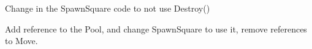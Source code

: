 \documentclass{article}
\title{}
\begin{document}


\clearpage

\clearpage

\clearpage

\clearpage
Change in the SpawnSquare code to not use Destroy()

\clearpage

\clearpage
Add reference to the Pool, and change SpawnSquare to use it, remove references to Move.

\end{document}
